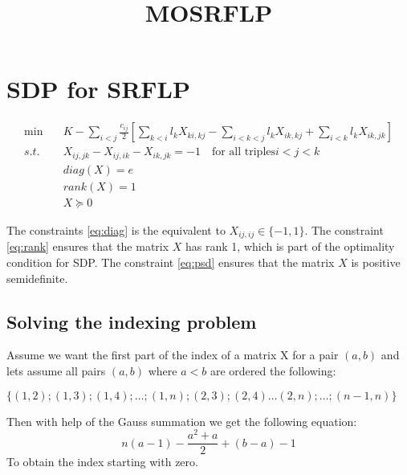 \documentclass[a4paper]{article}
\begin{document}
\title{MOSRFLP}

\section*{SDP for SRFLP}

\begin{align}
    \min \quad & K - \sum_{i < j} \frac{c_{ij}}{2} \left[\sum_{k<i} l_k X_{ki,kj} - \sum_{i<k<j} l_k X_{ik,kj} + \sum_{i<k} l_k X_{ik,jk}\right]  \label{eq:obj} \\
    s.t. \quad & X_{ij,jk} - X_{ij,ik} - X_{ik,jk} = -1 \quad \text{for all triples} i < j < k                                                   \label{eq:transitivity} \\
               & diag(X) = e                                                                                                                      \label{eq:diag} \\
               & rank(X) = 1                                                                                                                      \label{eq:rank} \\
               & X \succeq 0 \label{eq:psd}
\end{align}

The constraints \eqref{eq:diag} is the equivalent to $X_{ij,ij} \in \{-1,1\}$. The constraint \eqref{eq:rank} ensures that the matrix $X$ has rank 1, which is part of the optimality condition for SDP. The constraint \eqref{eq:psd} ensures that the matrix $X$ is positive semidefinite.


\subsection*{Solving the indexing problem}
Assume we want the first part of the index of a matrix X for a pair $(a,b)$ and lets assume all pairs $(a,b)$ where $a < b$ are ordered the following:

$\{(1, 2); (1, 3); (1, 4); \dots; (1, n); (2, 3); (2, 4) \dots (2, n); \dots; (n-1, n)\}$

Then with help of the Gauss summation we get the following equation:
\begin{equation}
    n(a-1)-\frac{a^2+a}{2} + (b-a)-1
\end{equation}
To obtain the index starting with zero.
\end{document}

